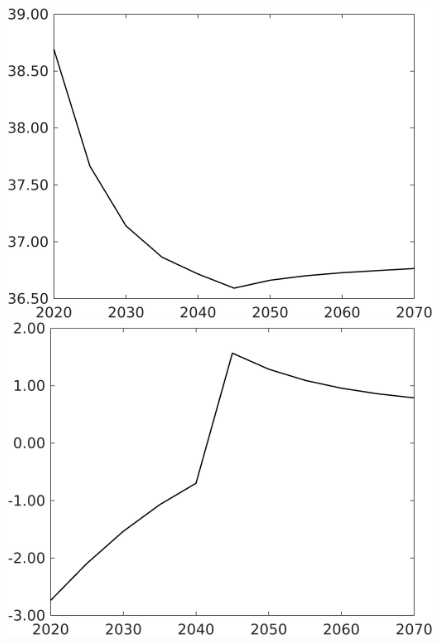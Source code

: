 \documentclass[12pt]{article}
\begin{document}
\begin{figure}[h!!]
\begin{minipage}[]{0.32\textwidth}
	\end{minipage}		
	\begin{minipage}[]{0.32\textwidth}
		\includegraphics[width=1\textwidth]{../../codding_model/own_basedOnFried/optimalPol_010922_revision/figures/all_13Sept22/CompTaufPER_bytaul_Equlab_Reg0_gAf_spillover0_nsk0_xgr0_knspil0_sep0_LFlimit1_emsbase0_countec0_GovRev0_etaa0.79_lgd0.png}
	\end{minipage}		
	\begin{minipage}[]{0.32\textwidth}
		\includegraphics[width=1\textwidth]{../../codding_model/own_basedOnFried/optimalPol_010922_revision/figures/all_13Sept22/CompTaufPER_bytaul_Equlab_Reg0_gAg_spillover0_nsk0_xgr0_knspil0_sep0_LFlimit1_emsbase0_countec0_GovRev0_etaa0.79_lgd0.png}

\end{minipage}
\end{figure}
\end{document}
